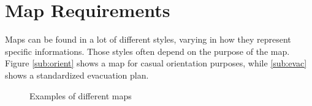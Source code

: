 
\newpage
\section{Map Requirements}
\label{ch:map_requirements}
Maps can be found in a lot of different styles,
varying in how they represent specific informations.
Those styles often depend on the purpose of the map.
Figure \ref{sub:orient} shows a map for casual orientation purposes,
while \ref{sub:evac} shows a standardized evacuation plan.

\begin{figure}[h!tp]
    \centering
    \hspace{0.1\textwidth}
    \caption{Examples of different maps}
    \label{fig:floor_plans}
\end{figure}

